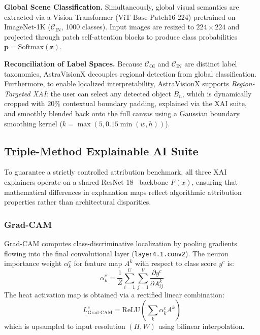 \documentclass[journal,10pt,twocolumn]{IEEEtran}
\begin{document}
\noindent\textbf{Global Scene Classification.} Simultaneously, global visual semantics are extracted via a Vision Transformer ($\text{ViT-Base-Patch16-224}$) pretrained on ImageNet-1K ($\mathcal{C}_{\text{IN}}$, 1000 classes). Input images are resized to $224 \times 224$ and projected through patch self-attention blocks to produce class probabilities $\mathbf{p} = \text{Softmax}(\mathbf{z})$.

\noindent\textbf{Reconciliation of Label Spaces.} Because $\mathcal{C}_{\text{OI}}$ and $\mathcal{C}_{\text{IN}}$ are distinct label taxonomies, AstraVisionX decouples regional detection from global classification. Furthermore, to enable localized interpretability, AstraVisionX supports \textit{Region-Targeted XAI}: the user can select any detected object $B_n$, which is dynamically cropped with $20\%$ contextual boundary padding, explained via the XAI suite, and smoothly blended back onto the full canvas using a Gaussian boundary smoothing kernel ($k = \max(5, 0.15 \min(w, h))$).

\subsection{Triple-Method Explainable AI Suite}
To guarantee a strictly controlled attribution benchmark, all three XAI explainers operate on a shared ResNet-18~\cite{he2016deep} backbone $F(x)$, ensuring that mathematical differences in explanation maps reflect algorithmic attribution properties rather than architectural disparities.

\subsubsection{Grad-CAM}
Grad-CAM computes class-discriminative localization by pooling gradients flowing into the final convolutional layer (\texttt{layer4.1.conv2}). The neuron importance weight $\alpha_k^c$ for feature map $A^k$ with respect to class score $y^c$ is:
\begin{equation}
\alpha_k^c = \frac{1}{Z} \sum_{i=1}^U \sum_{j=1}^V \frac{\partial y^c}{\partial A_{ij}^k}
\end{equation}
The heat activation map is obtained via a rectified linear combination:
\begin{equation}
L_{\text{Grad-CAM}}^c = \text{ReLU}\left(\sum_k \alpha_k^c A^k\right)
\end{equation}
which is upsampled to input resolution $(H, W)$ using bilinear interpolation.
\end{document}
